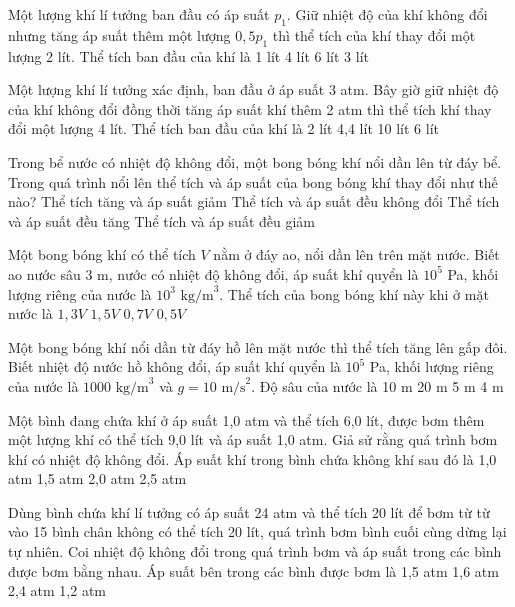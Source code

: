 \documentclass[12pt,a4paper]{article}
\begin{document}
\begin{multicols}{2}
	\begin{ex}
		Một lượng khí lí tưởng ban đầu có áp suất $p_1$. Giữ nhiệt độ của khí không đổi nhưng tăng áp suất thêm một lượng $0,5p_1$ thì thể tích của khí thay đổi một lượng 2 lít. Thể tích ban đầu của khí là
		\choice
		{1 lít}
		{4 lít}
		{6 lít}
		{3 lít}
	\end{ex}
	
	\begin{ex}
		Một lượng khí lí tưởng xác định, ban đầu ở áp suất 3 atm. Bây giờ giữ nhiệt độ của khí không đổi đồng thời tăng áp suất khí thêm 2 atm thì thể tích khí thay đổi một lượng 4 lít. Thể tích ban đầu của khí là
		\choice
		{2 lít}
		{4,4 lít}
		{10 lít}
		{6 lít}
	\end{ex}
	
	\begin{ex}
		Trong bể nước có nhiệt độ không đổi, một bong bóng khí nổi dần lên từ đáy bể. Trong quá trình nổi lên thể tích và áp suất của bong bóng khí thay đổi như thế nào?
		\choice
		{Thể tích tăng và áp suất giảm}
		{Thể tích và áp suất đều không đổi}
		{Thể tích và áp suất đều tăng}
		{Thể tích và áp suất đều giảm}
	\end{ex}
	
	\begin{ex}
		Một bong bóng khí có thể tích $V$ nằm ở đáy ao, nổi dần lên trên mặt nước. Biết ao nước sâu 3 m, nước có nhiệt độ không đổi, áp suất khí quyển là $10^5$ Pa, khối lượng riêng của nước là $10^3 \text{ kg/m}^3$. Thể tích của bong bóng khí này khi ở mặt nước là
		\choice
		{$1,3V$}
		{$1,5V$}
		{$0,7V$}
		{$0,5V$}
	\end{ex}
	
	\begin{ex}
		Một bong bóng khí nổi dần từ đáy hồ lên mặt nước thì thể tích tăng lên gấp đôi. Biết nhiệt độ nước hồ không đổi, áp suất khí quyển là $10^5$ Pa, khối lượng riêng của nước là $1000 \text{ kg/m}^3$ và $g = 10 \text{ m/s}^2$. Độ sâu của nước là
		\choice
		{10 m}
		{20 m}
		{5 m}
		{4 m}
	\end{ex}
	
	\begin{ex}
		Một bình đang chứa khí ở áp suất 1,0 atm và thể tích 6,0 lít, được bơm thêm một lượng khí có thể tích 9,0 lít và áp suất 1,0 atm. Giả sử rằng quá trình bơm khí có nhiệt độ không đổi. Áp suất khí trong bình chứa không khí sau đó là
		\choice
		{1,0 atm}
		{1,5 atm}
		{2,0 atm}
		{2,5 atm}
	\end{ex}
	
	\begin{ex}
		Dùng bình chứa khí lí tưởng có áp suất 24 atm và thể tích 20 lít để bơm từ từ vào 15 bình chân không có thể tích 20 lít, quá trình bơm bình cuối cùng dừng lại tự nhiên. Coi nhiệt độ không đổi trong quá trình bơm và áp suất trong các bình được bơm bằng nhau. Áp suất bên trong các bình được bơm là
		\choice
		{1,5 atm}
		{1,6 atm}
		{2,4 atm}
		{1,2 atm}
	\end{ex}
	

\end{multicols}
\end{document}
